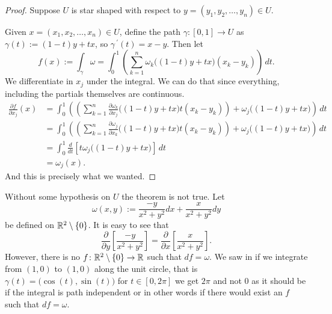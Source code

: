 \begin{proof}
Suppose $U$ is star shaped with respect to $y=(y_1,y_2,\ldots,y_n) \in U$.

Given $x = (x_1,x_2,\ldots,x_n) \in U$, define the path $\gamma \colon [0,1] \to U$ as
$\gamma(t) := (1-t)y + tx$, so $\gamma^{\:\prime}(t) = x-y$.  Then let
\begin{equation*}
f(x) := \int_{\gamma} \omega
=
\int_0^1
\left(
\sum_{k=1}^n
\omega_k \bigl((1-t)y + tx \bigr) (x_k-y_k)
\right) \, dt .
\end{equation*}
We differentiate in $x_j$ under the integral.  We can do that since
everything, including the partials themselves are continuous.
\begin{equation*}
\begin{split}
\frac{\partial f}{\partial x_j}(x) & =
\int_0^1
\left(
\left(
\sum_{k=1}^n
\frac{\partial \omega_k}{\partial x_j} \bigl((1-t)y + tx \bigr) t
(x_k-y_k)
\right)
+
\omega_j \bigl((1-t)y + tx \bigr)
\right)
 \, dt
\\
& = 
\int_0^1
\left(
\left(
\sum_{k=1}^n
\frac{\partial \omega_j}{\partial x_k} \bigl((1-t)y + tx \bigr) t
(x_k-y_k)
\right)
+
\omega_j \bigl((1-t)y + tx \bigr)
\right) \, dt
\\
& = 
\int_0^1
\frac{d}{dt}
\left[
t \omega_j\bigl((1-t)y + tx \bigr)
\right]
\,
dt
\\
&= \omega_j(x) .
\end{split}
\end{equation*}
And this is precisely what we wanted.
\end{proof}

\begin{example}
Without some hypothesis on $U$ the theorem is not true.  Let
\begin{equation*}
\omega(x,y) := \frac{-y}{x^2+y^2} dx + \frac{x}{x^2+y^2} dy
\end{equation*}
be defined on ${\mathbb{R}}^2 \setminus \{ 0 \}$.  It is easy to see that
\begin{equation*}
\frac{\partial}{\partial y} \left[ 
\frac{-y}{x^2+y^2} \right] =
\frac{\partial}{\partial x} \left[ 
\frac{x}{x^2+y^2} \right] .
\end{equation*}
However, there is no $f \colon {\mathbb{R}}^2 \setminus \{ 0 \} \to {\mathbb{R}}$ such that 
$df = \omega$.  We saw in 
 if we integrate from $(1,0)$ to $(1,0)$
along the unit circle, that is $\gamma(t) = \bigl(\cos(t),\sin(t)\bigr)$
for $t \in [0,2\pi]$ we get $2\pi$ and not 0 as it should be if the integral
is path independent or in other words if there would exist an $f$ such that
$df = \omega$.
\end{example}

